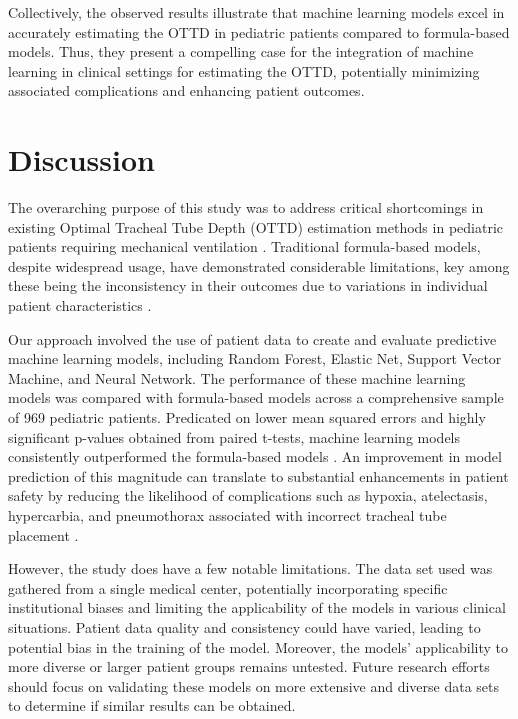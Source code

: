 \documentclass[11pt]{article}
\begin{document}
Collectively, the observed results illustrate that machine learning models excel in accurately estimating the OTTD in pediatric patients compared to formula-based models. Thus, they present a compelling case for the integration of machine learning in clinical settings for estimating the OTTD, potentially minimizing associated complications and enhancing patient outcomes.

\section*{Discussion}

The overarching purpose of this study was to address critical shortcomings in existing Optimal Tracheal Tube Depth (OTTD) estimation methods in pediatric patients requiring mechanical ventilation \cite{Kollef1994EndotrachealTM, Kerrey2009APC}. Traditional formula-based models, despite widespread usage, have demonstrated considerable limitations, key among these being the inconsistency in their outcomes due to variations in individual patient characteristics \cite{Shi2020TheEO, Fan1999EFFECTSOS}.

Our approach involved the use of patient data to create and evaluate predictive machine learning models, including Random Forest, Elastic Net, Support Vector Machine, and Neural Network. The performance of these machine learning models was compared with formula-based models across a comprehensive sample of 969 pediatric patients. Predicated on lower mean squared errors and highly significant p-values obtained from paired t-tests, machine learning models consistently outperformed the formula-based models \cite{Kwong2021PosteriorUV, Rau2018MortalityPI}. An improvement in model prediction of this magnitude can translate to substantial enhancements in patient safety by reducing the likelihood of complications such as hypoxia, atelectasis, hypercarbia, and pneumothorax associated with incorrect tracheal tube placement \cite{Kollef1994EndotrachealTM}.

However, the study does have a few notable limitations. The data set used was gathered from a single medical center, potentially incorporating specific institutional biases and limiting the applicability of the models in various clinical situations. Patient data quality and consistency could have varied, leading to potential bias in the training of the model. Moreover, the models' applicability to more diverse or larger patient groups remains untested. Future research efforts should focus on validating these models on more extensive and diverse data sets to determine if similar results can be obtained.
\end{document}
